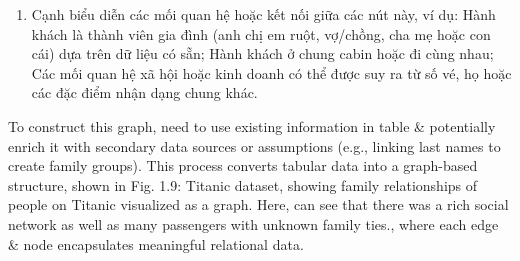 \documentclass{article}
\begin{document}
\begin{itemize}
\begin{itemize}
\begin{itemize}
\begin{itemize}
\begin{enumerate}
                    \item Cạnh biểu diễn các mối quan hệ hoặc kết nối giữa các nút này, ví dụ: Hành khách là thành viên gia đình (anh chị em ruột, vợ/chồng, cha mẹ hoặc con cái) dựa trên dữ liệu có sẵn; Hành khách ở chung cabin hoặc đi cùng nhau; Các mối quan hệ xã hội hoặc kinh doanh có thể được suy ra từ số vé, họ hoặc các đặc điểm nhận dạng chung khác.
                \end{enumerate}
                To construct this graph, need to use existing information in table \& potentially enrich it with secondary data sources or assumptions (e.g., linking last names to create family groups). This process converts tabular data into a graph-based structure, shown in {\sf Fig. 1.9: Titanic dataset, showing family relationships of people on Titanic visualized as a graph. Here, can see that there was a rich social network as well as many passengers with unknown family ties.}, where each edge \& node encapsulates meaningful relational data.


\end{itemize}
\end{itemize}
\end{itemize}
\end{itemize}
\end{document}
